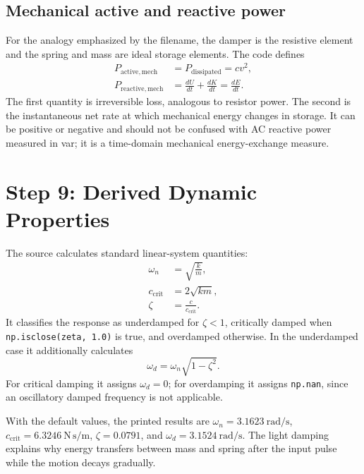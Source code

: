 \documentclass[11pt]{article}
\begin{document}
\subsection{Mechanical active and reactive power}
For the analogy emphasized by the filename, the damper is the resistive element and the spring and mass are ideal storage elements. The code defines
\begin{align}
P_{\mathrm{active,mech}}&=P_{\mathrm{dissipated}}=cv^2,\\
P_{\mathrm{reactive,mech}}&=\frac{dU}{dt}+\frac{dK}{dt}=\frac{dE}{dt}.
\end{align}
The first quantity is irreversible loss, analogous to resistor power. The second is the instantaneous net rate at which mechanical energy changes in storage. It can be positive or negative and should not be confused with AC reactive power measured in var; it is a time-domain mechanical energy-exchange measure.

\section{Step 9: Derived Dynamic Properties}
The source calculates standard linear-system quantities:
\begin{align}
\omega_n&=\sqrt{\frac{k}{m}},\\
c_{\mathrm{crit}}&=2\sqrt{km},\\
\zeta&=\frac{c}{c_{\mathrm{crit}}}.
\end{align}
It classifies the response as underdamped for $\zeta<1$, critically damped when \texttt{np.isclose(zeta, 1.0)} is true, and overdamped otherwise. In the underdamped case it additionally calculates
\begin{equation}
\omega_d=\omega_n\sqrt{1-\zeta^2}.
\end{equation}
For critical damping it assigns $\omega_d=0$; for overdamping it assigns \texttt{np.nan}, since an oscillatory damped frequency is not applicable.

With the default values, the printed results are $\omega_n=3.1623\ \mathrm{rad/s}$, $c_{\mathrm{crit}}=6.3246\ \mathrm{N\,s/m}$, $\zeta=0.0791$, and $\omega_d=3.1524\ \mathrm{rad/s}$. The light damping explains why energy transfers between mass and spring after the input pulse while the motion decays gradually.
\end{document}
